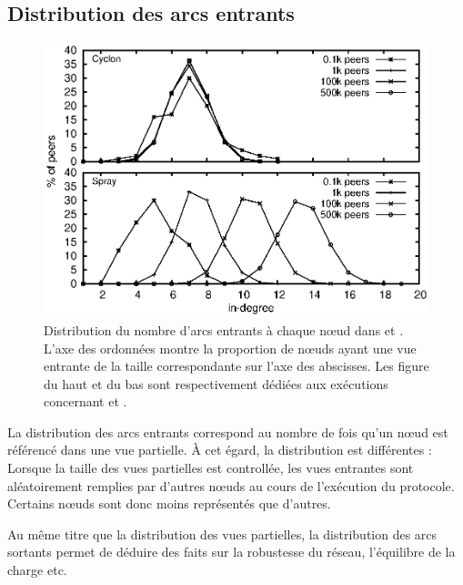 \subsection{Distribution des arcs entrants}
\label{net:subsec:inview}

\begin{figure}
  \centering
  \includegraphics[width=.8\textwidth]{img/spray/histo.eps}
  \caption{\label{net:fig:inview} Distribution du nombre d'arcs entrants à
    chaque nœud dans \CYCLON et \SPRAY. L'axe des ordonnées montre la proportion
    de nœuds ayant une vue entrante de la taille correspondante sur l'axe des
    abscisses. Les figure du haut et du bas sont respectivement dédiées aux
    exécutions concernant \CYCLON et \SPRAY.}
\end{figure}

La distribution des arcs entrants correspond au nombre de fois qu'un nœud est
référencé dans une vue partielle. À cet égard, la distribution est différentes :
Lorsque la taille des vues partielles est controllée, les vues entrantes sont
aléatoirement remplies par d'autres nœuds au cours de l'exécution du
protocole. Certains nœuds sont donc moins représentés que d'autres.

Au même titre que la distribution des vues partielles, la distribution des arcs
sortants permet de déduire des faits sur la robustesse du réseau, l'équilibre de
la charge etc.  


